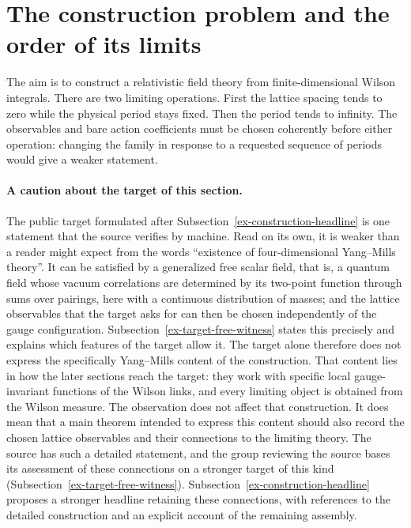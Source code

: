 \section{The construction problem and the order of its limits}
\label{ex-statement}

The aim is to construct a relativistic field theory from finite-dimensional
Wilson integrals. There are two limiting operations. First the lattice spacing
tends to zero while the physical period stays fixed. Then the period tends to
infinity. The observables and bare action coefficients must be chosen coherently
before either operation: changing the family in response to a requested sequence
of periods would give a weaker statement.

\paragraph{A caution about the target of this section.}
The public target formulated after Subsection~\ref{ex-construction-headline}
is one statement that the source verifies by machine. Read on its own, it is weaker than a reader might expect from the
words ``existence of four-dimensional Yang--Mills theory''. It can be
satisfied by a generalized free scalar field, that is, a quantum field whose
vacuum correlations are determined by its two-point function through sums
over pairings, here with a continuous distribution of masses; and the lattice
observables that the target asks for can then be chosen independently of the
gauge configuration. Subsection~\ref{ex-target-free-witness} states this
precisely and explains which features of the target allow it. The target
alone therefore does not express the specifically Yang--Mills content of the
construction. That content lies in how the later sections reach the target:
they work with specific local gauge-invariant functions of the Wilson links,
and every limiting object is obtained from the Wilson measure. The
observation does not affect that construction. It does mean that a main
theorem intended to express this content should also record the chosen
lattice observables and their connections to the limiting theory. The source
has such a detailed statement, and the group reviewing the source bases its
assessment of these connections on a stronger target of this kind
(Subsection~\ref{ex-target-free-witness}). Subsection~\ref{ex-construction-headline}
proposes a stronger headline retaining these connections, with references
to the detailed construction and an explicit account of the remaining assembly.

